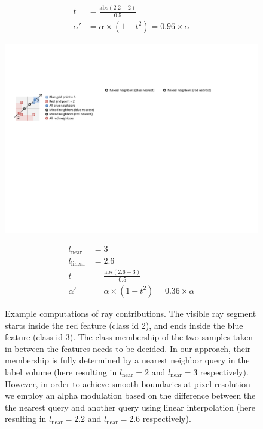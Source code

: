 \documentclass{egpubl}
\begin{document}
\begin{figure}
\begin{minipage}{0.27\linewidth}
\begin{minipage}{1.0\linewidth}
\begin{align}
t &= \frac{\mathrm{abs}(2.2-2)}{0.5}\nonumber\\
\alpha' &= \alpha \times (1-t^2) = 0.96 \times \alpha\nonumber
\end{align}
\end{minipage}
\end{minipage}\hfill
\begin{minipage}{0.27\linewidth}
\begin{minipage}{1.0\linewidth}
\includegraphics[width=1.0\linewidth]{figures/Neighborhood_blue}
\end{minipage}
\begin{minipage}{1.0\linewidth}
\begin{align}
l_\mathrm{near} &= 3\nonumber\\
l_\mathrm{linear} &= 2.6\nonumber\\
t &= \frac{\mathrm{abs}(2.6-3)}{0.5}\nonumber\\
\alpha' &= \alpha \times (1-t^2) = 0.36 \times \alpha\nonumber
\end{align}
\end{minipage}
\end{minipage}
\caption{\label{fig:example-illustration}
Example computations of ray contributions. The visible ray segment starts inside the red feature (class id 2), and ends inside the blue feature (class id 3). The class membership of the two samples taken in between the features needs to be decided. In our approach, their membership is fully determined by a nearest neighbor query in the label volume (here resulting in $l_\mathrm{near}=2$ and $l_\mathrm{near}=3$ respectively). However, in order to achieve smooth boundaries at pixel-resolution we employ an alpha modulation based on the difference between the the nearest query and another query using linear interpolation (here resulting in $l_\mathrm{near}=2.2$ and $l_\mathrm{near}=2.6$ respectively). 
}
\end{figure}
\end{document}
